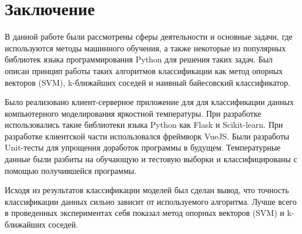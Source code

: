 \newpage
\section{Заключение}
В данной работе были рассмотрены сферы деятельности и основные задачи, где используются методы машинного обучения, а также некоторые из популярных библиотек языка программирования Python для решения таких задач. Был описан принцип работы таких алгоритмов классификации как метод опорных векторов (SVM), k-ближайших соседей и наивный байесовский классификатор.
\par
Было реализовано клиент-серверное приложение для для классификации данных компьютерного моделирования яркостной температуры. При разработке использовались такие библиотеки языка Python как Flask и Scikit-learn. При разработке клиентской части использовался фреймворк VueJS. Были разработы Unit-тесты для упрощения доработок программы в будущем. Температурные данные были разбиты на обучающую и тестовую выборки и классифицированы с помощью получившейся программы.
\par
Исходя из результатов классификации моделей был сделан вывод, что точность классификации данных сильно зависит от используемого алгоритма. Лучше всего в проведенных экспериментах себя показал метод опорных векторов (SVM) и k-ближайших соседей.